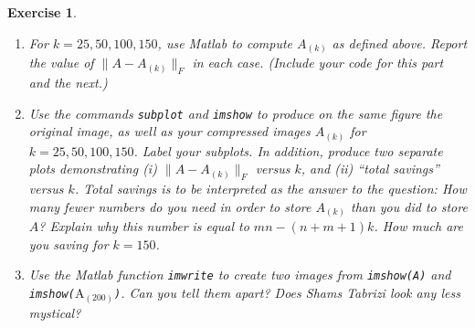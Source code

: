 \documentclass[12pt]{article}
\theoremstyle{colon}
\newtheorem{exercise}{Exercise}
\begin{document}
\begin{exercise}
\begin{enumerate}[label=\arabic*)]
    \item For $k = 25, 50, 100, 150$, use Matlab to compute $A_{(k)}$ as defined above. Report the value of $\lVert A - A_{(k)} \rVert_F$ in each case. (Include your code for this part and the next.)

    \item Use the commands \texttt{subplot} and \texttt{imshow} to produce on the same figure the original image, as well as your compressed images $A_{(k)}$ for $k = 25, 50, 100, 150$. Label your subplots. In addition, produce two separate plots demonstrating (i) $\lVert A - A_{(k)} \rVert_F$ versus $k$, and (ii) ``total savings'' versus $k$. Total savings is to be interpreted as the answer to the question: How many fewer numbers do you need in order to store $A_{(k)}$ than you did to store $A$? Explain why this number is equal to $mn - (n+m+1)k$. How much are you saving for $k = 150$.

    \item Use the Matlab function \texttt{imwrite} to create two images from \texttt{imshow(A)} and \texttt{imshow($\text{A}_{(200)}$)}. Can you tell them apart? Does Shams Tabrizi look any less mystical?
  \end{enumerate}
\end{exercise}
\end{document}
